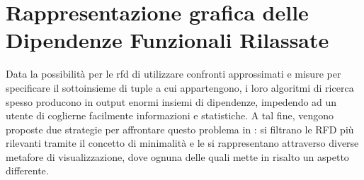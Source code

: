 \chapter{Rappresentazione grafica delle Dipendenze Funzionali Rilassate}
\label{cap4:visual_representation}

Data la possibilit\`{a} per le \acrshort{rfd} di utilizzare confronti approssimati e misure per specificare il sottoinsieme di tuple a cui appartengono, i loro algoritmi di ricerca spesso producono in output enormi insiemi di dipendenze, impedendo ad un utente di coglierne facilmente informazioni e statistiche. A tal fine, vengono proposte due strategie per affrontare questo problema in \cite{mdvisualization}: si filtrano le RFD pi\`{u} rilevanti tramite il concetto di minimalit\`{a} e le si rappresentano attraverso diverse metafore di visualizzazione, dove ognuna delle quali mette in risalto un aspetto differente.

